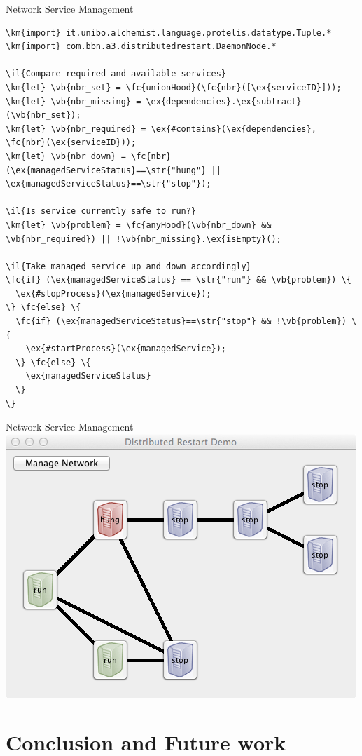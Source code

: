 \documentclass[presentation]{beamer} %
\newcommand{\il}[1]{{\it \textcolor{gray}{// #1}}} %
\newcommand{\km}[1]{\textcolor{purple}{#1}} %
\newcommand{\ex}[1]{\textcolor{blue}{#1}} %
\newcommand{\fc}[1]{\textcolor{Fuchsia}{#1}} %
\newcommand{\vb}[1]{\textcolor{OliveGreen}{#1}} %
\newcommand{\str}[1]{\textcolor{darkgray}{#1}} %
\begin{document}
\begin{frame}[fragile]{Network Service Management}
\begin{Verbatim}[fontsize=\scriptsize, frame=none, commandchars=\\\{\}]
\km{import} it.unibo.alchemist.language.protelis.datatype.Tuple.*
\km{import} com.bbn.a3.distributedrestart.DaemonNode.*

\il{Compare required and available services}
\km{let} \vb{nbr_set} = \fc{unionHood}(\fc{nbr}([\ex{serviceID}]));
\km{let} \vb{nbr_missing} = \ex{dependencies}.\ex{subtract}(\vb{nbr_set});
\km{let} \vb{nbr_required} = \ex{#contains}(\ex{dependencies}, \fc{nbr}(\ex{serviceID})); 
\km{let} \vb{nbr_down} = \fc{nbr}(\ex{managedServiceStatus}==\str{"hung"} || \ex{managedServiceStatus}==\str{"stop"});

\il{Is service currently safe to run?}
\km{let} \vb{problem} = \fc{anyHood}(\vb{nbr_down} && \vb{nbr_required}) || !\vb{nbr_missing}.\ex{isEmpty}();

\il{Take managed service up and down accordingly}
\fc{if} (\ex{managedServiceStatus} == \str{"run"} && \vb{problem}) \{
  \ex{#stopProcess}(\ex{managedService});
\} \fc{else} \{
  \fc{if} (\ex{managedServiceStatus}==\str{"stop"} && !\vb{problem}) \{
    \ex{#startProcess}(\ex{managedService});
  \} \fc{else} \{
    \ex{managedServiceStatus}
  \}
\}
\end{Verbatim}
\end{frame}

\begin{frame}{Network Service Management}
  \centering
  \includegraphics[width=0.8\textwidth{}]{imgs/management}
\end{frame}

\section{Conclusion and Future work}
\end{document}
